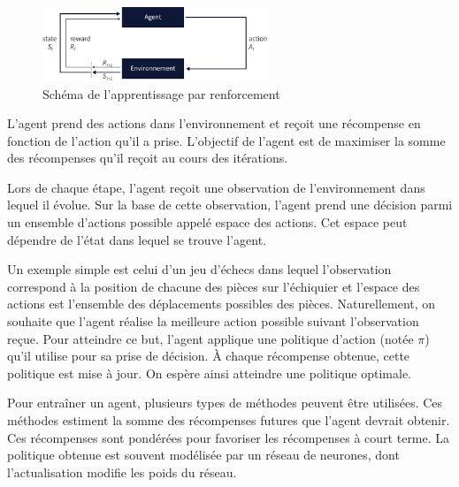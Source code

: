 \documentclass[french]{article}
\begin{document}
\begin{figure}[H]
    \centering
    \includegraphics[width=0.6\textwidth]{Images/RL.png}
    \caption{Schéma de l'apprentissage par renforcement}
\end{figure}

L'agent prend des actions dans l'environnement et reçoit une récompense en fonction de l'action qu'il a prise. 
L'objectif de l'agent est de maximiser la somme des récompenses qu'il reçoit au cours des itérations.

\vspace{0.5cm}
Lors de chaque étape, l'agent reçoit une observation de l'environnement dans lequel il évolue. Sur la base 
de cette observation, l'agent prend une décision parmi un ensemble d'actions possible appelé espace des actions. 
Cet espace peut dépendre de l'état dans lequel se trouve l'agent.

\vspace{0.5cm}
Un exemple simple est celui d'un jeu d'échecs dans lequel l'observation correspond à la position de chacune des 
pièces sur l'échiquier et l'espace des actions est l'ensemble des déplacements possibles des pièces. 
Naturellement, on souhaite que l'agent réalise la meilleure action possible suivant l'observation reçue. 
Pour atteindre ce but, l'agent applique une politique d'action (notée $\pi$) qu'il utilise pour sa prise de décision.
À chaque récompense obtenue, cette politique est mise à jour. On espère ainsi atteindre une politique optimale.

\vspace{0.5cm}
Pour entraîner un agent, plusieurs types de méthodes peuvent être utilisées. Ces méthodes estiment la somme des 
récompenses futures que l'agent devrait obtenir. Ces récompenses sont pondérées pour favoriser les récompenses 
à court terme. La politique obtenue est souvent modélisée par un réseau de neurones, dont l'actualisation modifie 
les poids du réseau.
\end{document}

